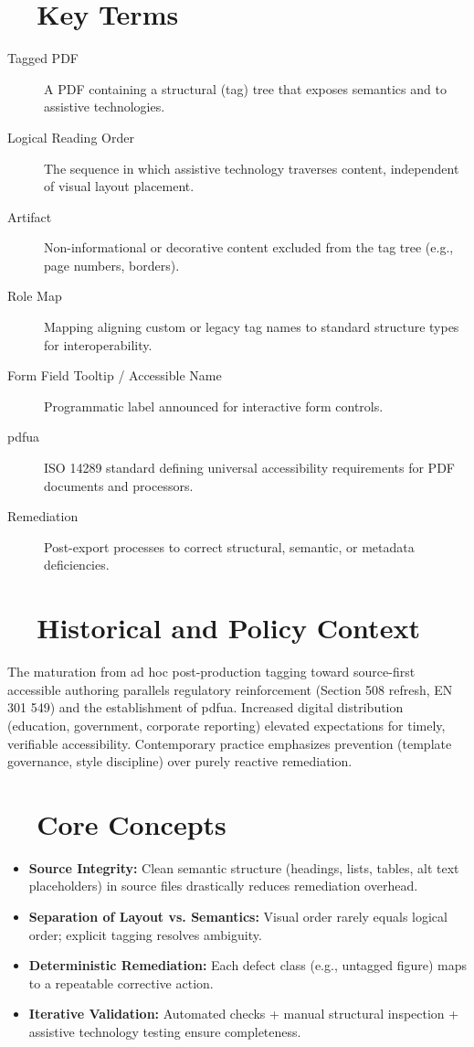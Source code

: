 \section{~~Key Terms}\label{ch18:sec:key-terms}
\begin{description}
	\item[Tagged PDF] A PDF containing a structural (tag) tree that exposes semantics and  to assistive technologies.
	\item[Logical Reading Order] The sequence in which assistive technology traverses content, independent of visual layout placement.
	\item[Artifact] Non-informational or decorative content excluded from the tag tree (e.g., page numbers, borders).
	\item[Role Map] Mapping aligning custom or legacy tag names to standard structure types for interoperability.
	\item[Form Field Tooltip / Accessible Name] Programmatic label announced for interactive form controls.
	\item[\gls{pdfua}] ISO 14289 standard defining universal accessibility requirements for PDF documents and processors.
	\item[Remediation] Post-export processes to correct structural, semantic, or metadata deficiencies.
\end{description}

\section{~~Historical and Policy Context}\label{ch18:sec:historical-policy}
The maturation from ad hoc post-production tagging toward source-first accessible authoring parallels regulatory reinforcement (Section 508 refresh, EN 301 549) and the establishment of \gls{pdfua}\supercite{AdobePDFUA}. Increased digital distribution (education, government, corporate reporting) elevated expectations for timely, verifiable accessibility. Contemporary practice emphasizes prevention (template governance, style discipline) over purely reactive remediation.

\section{~~Core Concepts}\label{ch18:sec:core-concepts}
\begin{itemize}
	\item \textbf{Source Integrity:} Clean semantic structure (headings, lists, tables, alt text placeholders) in source files drastically reduces remediation overhead.
	\item \textbf{Separation of Layout vs. Semantics:} Visual order rarely equals logical order; explicit tagging resolves ambiguity.
	\item \textbf{Deterministic Remediation:} Each defect class (e.g., untagged figure) maps to a repeatable corrective action.
	\item \textbf{Iterative Validation:} Automated checks + manual structural inspection + assistive technology testing ensure completeness.
\end{itemize}

